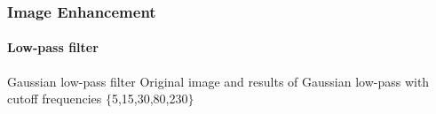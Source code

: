 \documentclass{beamer}
\begin{document}
\begin{frame}
\frametitle{Image Enhancement}
\framesubtitle{Low-pass filter}
\begin{block}{Gaussian low-pass filter}
\scriptsize{Original image and results of Gaussian low-pass with cutoff frequencies $\{$5,15,30,80,230$\}$}\\
\end{block}
\end{frame}
\end{document}
